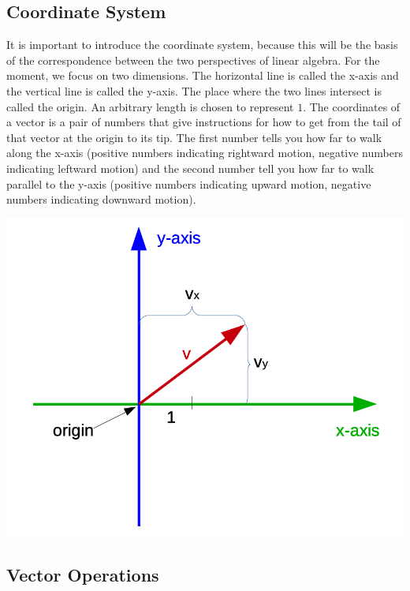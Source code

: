 \documentclass[
]{book}
\theoremstyle{definition}
\theoremstyle{definition}
\theoremstyle{definition}
\theoremstyle{remark}
\begin{document}
\hypertarget{intro-linalg-coordinate-system}{%
\subsection{Coordinate System}\label{intro-linalg-coordinate-system}}

It is important to introduce the coordinate system, because this will be the basis of the correspondence between the two perspectives of linear algebra. For the moment, we focus on two dimensions. The horizontal line is called the x-axis and the vertical line is called the y-axis. The place where the two lines intersect is called the origin. An arbitrary length is chosen to represent \(1\). The coordinates of a vector is a pair of numbers that give instructions for how to get from the tail of that vector at the origin to its tip. The first number tells you how far to walk along the x-axis (positive numbers indicating rightward motion, negative numbers indicating leftward motion) and the second number tell you how far to walk parallel to the y-axis (positive numbers indicating upward motion, negative numbers indicating downward motion).

\includegraphics[width=12.22in]{odg/coordinate-system}

\hypertarget{intro-linalg-vector-operations}{%
\subsection{Vector Operations}\label{intro-linalg-vector-operations}}
\end{document}
